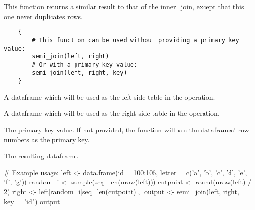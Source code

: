 \documentclass[a4paper]{book}
\begin{document}
%
\begin{Description}\relax
This function returns a similar result to that of the inner\_join, except that this one never duplicates rows.
\end{Description}
%
\begin{Usage}
\begin{verbatim}
    {
        # This function can be used without providing a primary key value:
        semi_join(left, right)
        # Or with a primary key value:
        semi_join(left, right, key)
    }
\end{verbatim}
\end{Usage}
%
\begin{Arguments}
\begin{ldescription}
\item[\code{left}] A dataframe which will be used as the left-side table in the operation.
\item[\code{right}] A dataframe which will be used as the right-side table in the operation.
\item[\code{key}] The primary key value. If not provided, the function will use the dataframes' row numbers as the primary key.
\end{ldescription}
\end{Arguments}
%
\begin{Value}
\begin{ldescription}
\item[\code{rtn}] The resulting dataframe.
\end{ldescription}
\end{Value}
%
\begin{Examples}
\begin{ExampleCode}
    # Example usage:
    left <- data.frame(id = 100:106, letter = c('a', 'b', 'c', 'd', 'e', 'f', 'g'))
    random_i <- sample(seq_len(nrow(left)))
    cutpoint <- round(nrow(left) / 2)
    right <- left[random_i[seq_len(cutpoint)],]
    output <- semi_join(left, right, key = "id")
    output
\end{ExampleCode}
\end{Examples}
\printindex{}
\end{document}
